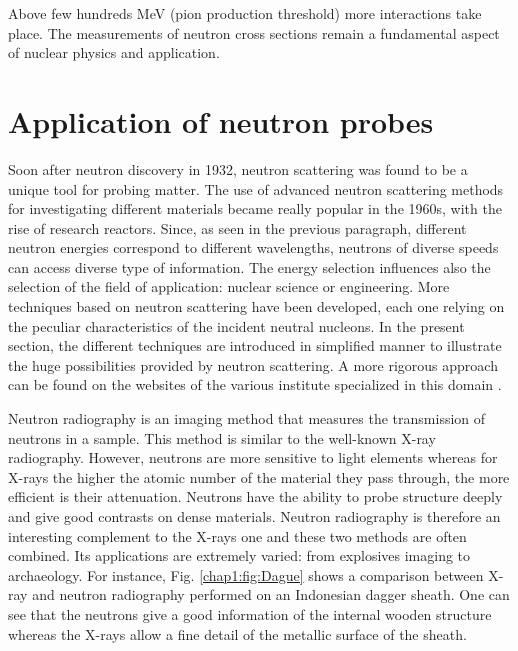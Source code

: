 \begin{refsection}
  Above few hundreds MeV (pion production threshold) more interactions take place. The measurements of neutron cross sections remain a fundamental aspect of nuclear physics and application.


  \section{Application of neutron probes}
  Soon after neutron discovery in 1932, neutron scattering was found to be a unique tool for probing matter.  The use of advanced neutron scattering methods for investigating different materials became really popular in the 1960s, with the rise of research reactors. Since, as seen in the previous paragraph, different neutron energies correspond to different wavelengths, neutrons of diverse speeds can access diverse type of information. The energy selection influences also the selection of the field of application:  nuclear science or engineering. More techniques based on neutron scattering have been developed, each one relying on the peculiar characteristics of the incident neutral nucleons. In the present section, the different techniques are introduced in simplified manner to illustrate the huge possibilities provided by neutron scattering. A more rigorous approach can be found on the websites of the various institute specialized in this domain \cite{LLBinfo,ILLinfo,ISISinfo}.

  Neutron radiography is an imaging method that measures the transmission of neutrons in a sample. This method is similar to the well-known X-ray radiography. However, neutrons are more sensitive to light elements whereas for X-rays the higher the atomic number of the material they pass through, the more efficient is their attenuation. Neutrons have the ability to probe structure deeply and give good contrasts on dense materials. Neutron radiography is therefore an interesting complement to the X-rays one and these two methods are often combined. Its applications are extremely varied: from explosives imaging to archaeology. For instance, Fig. \ref{chap1:fig:Dague} shows a comparison between  X-ray and neutron radiography performed on an Indonesian dagger sheath. One can see that the neutrons give a good information of the internal wooden structure whereas the X-rays allow a fine detail of the metallic surface of the sheath.


\end{refsection}
